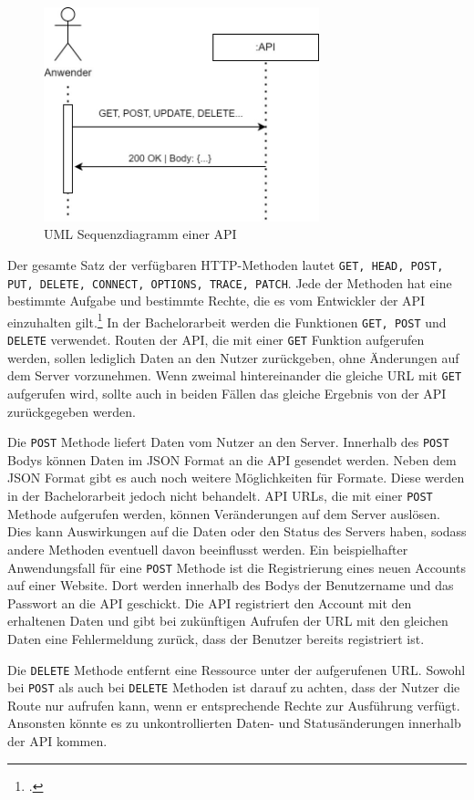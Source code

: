 \begin{figure}[H]
  \centering
    \includegraphics[width = 8cm]{bilder/APISequenzdiagramm}
    \caption{UML Sequenzdiagramm einer API}
\end{figure}

Der gesamte Satz der verfügbaren HTTP-Methoden lautet \texttt{GET, HEAD, POST, PUT, DELETE, CONNECT, OPTIONS, TRACE, PATCH}. Jede der Methoden hat eine bestimmte Aufgabe und bestimmte Rechte, die es vom Entwickler der API einzuhalten gilt.\footcite{mdn2022http} In der Bachelorarbeit werden die Funktionen \texttt{GET, POST} und \texttt{DELETE} verwendet. Routen der API, die mit einer \texttt{GET} Funktion aufgerufen werden, sollen lediglich Daten an den Nutzer zurückgeben, ohne Änderungen auf dem Server vorzunehmen. Wenn zweimal hintereinander die gleiche URL mit \texttt{GET} aufgerufen wird, sollte auch in beiden Fällen das gleiche Ergebnis von der API zurückgegeben werden.

Die \texttt{POST} Methode liefert Daten vom Nutzer an den Server. Innerhalb des \texttt{POST} Bodys können Daten im JSON Format an die API gesendet werden. Neben dem JSON Format gibt es auch noch weitere Möglichkeiten für Formate. Diese werden in der Bachelorarbeit jedoch nicht behandelt. API URLs, die mit einer \texttt{POST} Methode aufgerufen werden, können Veränderungen auf dem Server auslösen. Dies kann Auswirkungen auf die Daten oder den Status des Servers haben, sodass andere Methoden eventuell davon beeinflusst werden. Ein beispielhafter Anwendungsfall für eine \texttt{POST} Methode ist die Registrierung eines neuen Accounts auf einer Website. Dort werden innerhalb des Bodys der Benutzername und das Passwort an die API geschickt. Die API registriert den Account mit den erhaltenen Daten und gibt bei zukünftigen Aufrufen der URL mit den gleichen Daten eine Fehlermeldung zurück, dass der Benutzer bereits registriert ist.

Die \texttt{DELETE} Methode entfernt eine Ressource unter der aufgerufenen URL. Sowohl bei \texttt{POST} als auch bei \texttt{DELETE} Methoden ist darauf zu achten, dass der Nutzer die Route nur aufrufen kann, wenn er entsprechende Rechte zur Ausführung verfügt. Ansonsten könnte es zu unkontrollierten Daten- und Statusänderungen innerhalb der API kommen. 

